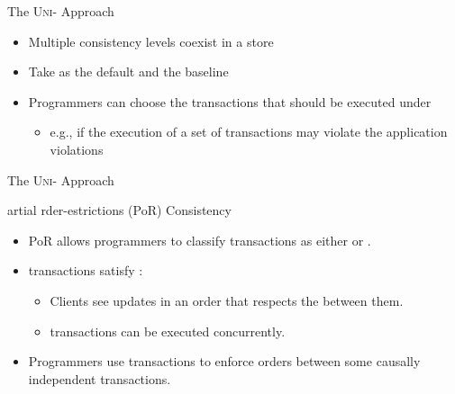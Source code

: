 \begin{frame}{The \textsc{Uni-} Approach}
  \begin{itemize}[<+->]
    \setlength{\itemsep}{8pt}
    \item Multiple consistency levels coexist in a store
    \item Take  as the default and the baseline
    \item Programmers can choose the transactions that should be executed under
           \\[3pt]
          \begin{itemize}
            \item e.g., if the execution of a set of transactions may violate the application
                  violations
          \end{itemize}
  \end{itemize}
\end{frame}

\begin{frame}{The \textsc{Uni-} Approach}
  \begin{center}
    {artial rder-estrictions (PoR) Consistency} \\[3pt]
  \end{center}

  \pause
  \begin{itemize}
    \setlength{\itemsep}{8pt}
    \item PoR allows programmers to classify transactions as either 
          or . \pause
    \item {} transactions satisfy \cc:
          \begin{itemize}
            \item Clients see updates in an order that respects the 
                  between them. \\[3pt]
            \item {} transactions can be executed concurrently.
          \end{itemize}
          \pause
    \item Programmers use  transactions to enforce orders between
          some causally independent transactions.
  \end{itemize}
\end{frame}

